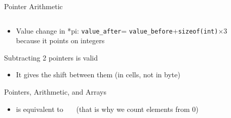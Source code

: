 \begin{Coupe}
\begin{frame}{Pointer Arithmetic}
\begin{columns}
\begin{column}{.55\linewidth}
    \end{column}    
  \end{columns}
  \begin{itemize}
  \item Value change in *pi:  \texttt{value\_after}= \texttt{value\_before}+\texttt{sizeof(int)}$\times3$\\
    because it points on integers
  \end{itemize}
  \begin{block}{Subtracting 2 pointers is valid} 
    \begin{itemize}
    \item It gives the shift between them (in cells, not in byte)
    \end{itemize}
  \end{block}


  \begin{block}{Pointers, Arithmetic, and Arrays}
    \begin{itemize}
    \item {} is equivalent to 
      ~~~(that is why we count elements from 0)
    \end{itemize}
  \end{block}
\end{frame}

\end{Coupe}
